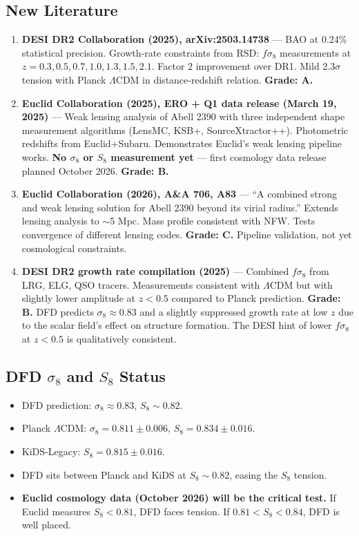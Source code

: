 \documentclass[11pt,a4paper]{article}
\begin{document}
\subsection{New Literature}

\begin{enumerate}

\item \textbf{DESI DR2 Collaboration (2025), arXiv:2503.14738} --- BAO at 0.24\% statistical precision. Growth-rate constraints from RSD: $f\sigma_8$ measurements at $z = 0.3, 0.5, 0.7, 1.0, 1.3, 1.5, 2.1$. Factor 2 improvement over DR1. Mild 2.3$\sigma$ tension with Planck $\Lambda$CDM in distance-redshift relation. \textbf{Grade: A.}

\item \textbf{Euclid Collaboration (2025), ERO + Q1 data release (March 19, 2025)} --- Weak lensing analysis of Abell 2390 with three independent shape measurement algorithms (LensMC, KSB+, SourceXtractor++). Photometric redshifts from Euclid+Subaru. Demonstrates Euclid's weak lensing pipeline works. \textbf{No $\sigma_8$ or $S_8$ measurement yet} --- first cosmology data release planned October 2026. \textbf{Grade: B.}

\item \textbf{Euclid Collaboration (2026), A\&A 706, A83} --- ``A combined strong and weak lensing solution for Abell 2390 beyond its virial radius.'' Extends lensing analysis to $\sim$5 Mpc. Mass profile consistent with NFW. Tests convergence of different lensing codes. \textbf{Grade: C.} Pipeline validation, not yet cosmological constraints.

\item \textbf{DESI DR2 growth rate compilation (2025)} --- Combined $f\sigma_8$ from LRG, ELG, QSO tracers. Measurements consistent with $\Lambda$CDM but with slightly lower amplitude at $z < 0.5$ compared to Planck prediction. \textbf{Grade: B.} DFD predicts $\sigma_8 \approx 0.83$ and a slightly suppressed growth rate at low $z$ due to the scalar field's effect on structure formation. The DESI hint of lower $f\sigma_8$ at $z < 0.5$ is qualitatively consistent.

\end{enumerate}

\subsection{DFD $\sigma_8$ and $S_8$ Status}

\begin{itemize}
\item DFD prediction: $\sigma_8 \approx 0.83$, $S_8 \sim 0.82$.
\item Planck $\Lambda$CDM: $\sigma_8 = 0.811 \pm 0.006$, $S_8 = 0.834 \pm 0.016$.
\item KiDS-Legacy: $S_8 = 0.815 \pm 0.016$.
\item DFD sits between Planck and KiDS at $S_8 \sim 0.82$, easing the $S_8$ tension.
\item \textbf{Euclid cosmology data (October 2026) will be the critical test.} If Euclid measures $S_8 < 0.81$, DFD faces tension. If $0.81 < S_8 < 0.84$, DFD is well placed.
\end{itemize}
\end{document}
